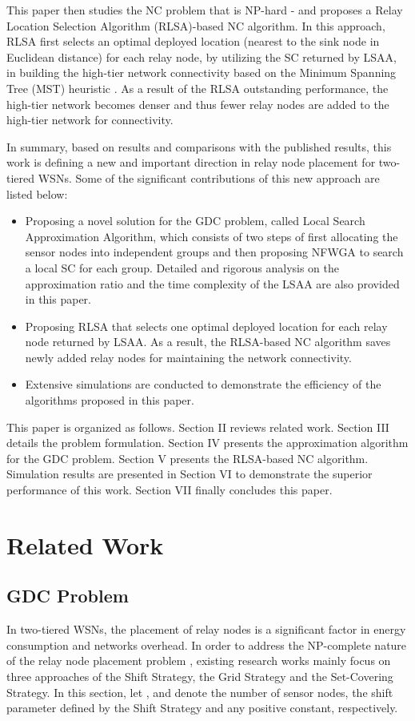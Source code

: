 \documentclass[journal]{IEEEtran}
\begin{document}
This paper then studies the NC problem that is NP-hard \cite{Lin99}-\cite{Dandekar12} and proposes a Relay Location Selection Algorithm (RLSA)-based NC algorithm. In this approach, RLSA first selects an optimal deployed location (nearest to the sink node in Euclidean distance) for each relay node, by utilizing the SC returned by LSAA, in building the high-tier network connectivity based on the Minimum Spanning Tree (MST) heuristic \cite{Lloyd07}. As a result of the RLSA outstanding performance, the high-tier network becomes denser and thus fewer relay nodes are added to the high-tier network for connectivity.

In summary, based on results and comparisons with the published results, this work is defining a new and important direction in relay node placement for two-tiered WSNs. Some of the significant contributions of this new approach are listed below:

\begin{itemize}
  \item Proposing a novel solution for the GDC problem, called Local Search Approximation Algorithm, which consists of two steps of first allocating the sensor nodes into independent groups and then proposing NFWGA to search a local SC for each group. Detailed and rigorous analysis on the approximation ratio and the time complexity of the LSAA are also provided in this paper.
  \item Proposing RLSA that selects one optimal deployed location for each relay node returned by LSAA. As a result, the RLSA-based NC algorithm saves newly added relay nodes for maintaining the network connectivity.
  \item Extensive simulations are conducted to demonstrate the efficiency of the algorithms proposed in this paper.
\end{itemize}

This paper is organized as follows. Section II reviews related work. Section III details the problem formulation. Section IV presents the approximation algorithm for the GDC problem. Section V presents the RLSA-based NC algorithm. Simulation results are presented in Section VI to demonstrate the superior performance of this work. Section VII finally concludes this paper.

\section{Related Work}
\subsection{GDC Problem}
In two-tiered WSNs, the placement of relay nodes is a significant factor in energy consumption and networks overhead. In order
to address the NP-complete nature of the relay node placement problem \cite{Fowler81}, existing research works mainly focus on three approaches of the Shift Strategy, the Grid Strategy and the Set-Covering Strategy. In this section, let ,  and  denote the number of sensor nodes, the shift parameter defined by the Shift Strategy and any positive constant, respectively.
\end{document}
